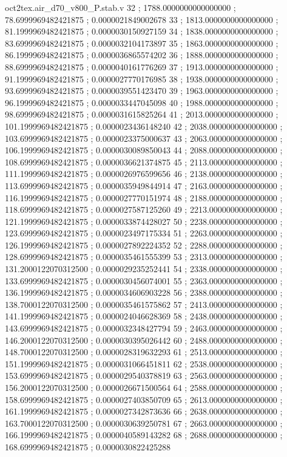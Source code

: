 \begin{filecontents}[overwrite]{oct2tex.air_d70_v800_P.stab.v}
32 ; 1788.0000000000000000 ; 78.6999969482421875 ; 0.0000021849002678
33 ; 1813.0000000000000000 ; 81.1999969482421875 ; 0.0000030150927159
34 ; 1838.0000000000000000 ; 83.6999969482421875 ; 0.0000032104173897
35 ; 1863.0000000000000000 ; 86.1999969482421875 ; 0.0000036865574202
36 ; 1888.0000000000000000 ; 88.6999969482421875 ; 0.0000040161776269
37 ; 1913.0000000000000000 ; 91.1999969482421875 ; 0.0000027770176985
38 ; 1938.0000000000000000 ; 93.6999969482421875 ; 0.0000039551423470
39 ; 1963.0000000000000000 ; 96.1999969482421875 ; 0.0000033447045098
40 ; 1988.0000000000000000 ; 98.6999969482421875 ; 0.0000031615825264
41 ; 2013.0000000000000000 ; 101.1999969482421875 ; 0.0000023436148240
42 ; 2038.0000000000000000 ; 103.6999969482421875 ; 0.0000023375000637
43 ; 2063.0000000000000000 ; 106.1999969482421875 ; 0.0000030089850043
44 ; 2088.0000000000000000 ; 108.6999969482421875 ; 0.0000036621374875
45 ; 2113.0000000000000000 ; 111.1999969482421875 ; 0.0000026976599656
46 ; 2138.0000000000000000 ; 113.6999969482421875 ; 0.0000035949844914
47 ; 2163.0000000000000000 ; 116.1999969482421875 ; 0.0000027770151974
48 ; 2188.0000000000000000 ; 118.6999969482421875 ; 0.0000027587125260
49 ; 2213.0000000000000000 ; 121.1999969482421875 ; 0.0000033874428027
50 ; 2238.0000000000000000 ; 123.6999969482421875 ; 0.0000023497175334
51 ; 2263.0000000000000000 ; 126.1999969482421875 ; 0.0000027892224352
52 ; 2288.0000000000000000 ; 128.6999969482421875 ; 0.0000035461555399
53 ; 2313.0000000000000000 ; 131.2000122070312500 ; 0.0000029235252441
54 ; 2338.0000000000000000 ; 133.6999969482421875 ; 0.0000030456074001
55 ; 2363.0000000000000000 ; 136.1999969482421875 ; 0.0000034606903228
56 ; 2388.0000000000000000 ; 138.7000122070312500 ; 0.0000035461575862
57 ; 2413.0000000000000000 ; 141.1999969482421875 ; 0.0000024046628369
58 ; 2438.0000000000000000 ; 143.6999969482421875 ; 0.0000032348427794
59 ; 2463.0000000000000000 ; 146.2000122070312500 ; 0.0000030395026442
60 ; 2488.0000000000000000 ; 148.7000122070312500 ; 0.0000028319632293
61 ; 2513.0000000000000000 ; 151.1999969482421875 ; 0.0000031066451811
62 ; 2538.0000000000000000 ; 153.6999969482421875 ; 0.0000029540378819
63 ; 2563.0000000000000000 ; 156.2000122070312500 ; 0.0000026671500564
64 ; 2588.0000000000000000 ; 158.6999969482421875 ; 0.0000027403850709
65 ; 2613.0000000000000000 ; 161.1999969482421875 ; 0.0000027342873636
66 ; 2638.0000000000000000 ; 163.7000122070312500 ; 0.0000030639250781
67 ; 2663.0000000000000000 ; 166.1999969482421875 ; 0.0000040589143282
68 ; 2688.0000000000000000 ; 168.6999969482421875 ; 0.0000030822425288

\end{filecontents}
